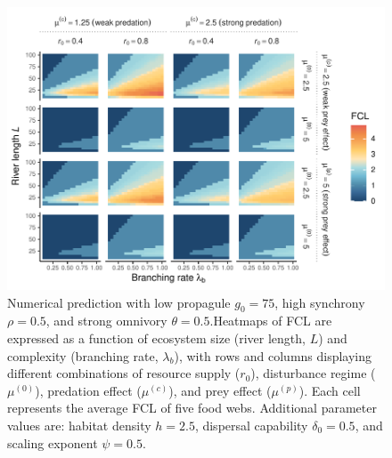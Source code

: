 \begin{figure}
\centering
\includegraphics{../data_fmt/fig_rho05_g75_theta05.pdf}
\caption{\label{fig:fig-num7}Numerical prediction with low propagule
\(g_0 = 75\), high synchrony \(\rho = 0.5\), and strong omnivory
\(\theta = 0.5\).Heatmaps of FCL are expressed as a function of
ecosystem size (river length, \(L\)) and complexity (branching rate,
\(\lambda_b\)), with rows and columns displaying different combinations
of resource supply (\(r_0\)), disturbance regime (\(\mu^{(0)}\)),
predation effect (\(\mu^{(c)}\)), and prey effect (\(\mu^{(p)}\)). Each
cell represents the average FCL of five food webs. Additional parameter
values are: habitat density \(h=2.5\), dispersal capability
\(\delta_0=0.5\), and scaling exponent \(\psi=0.5\).}
\end{figure}

\newpage

